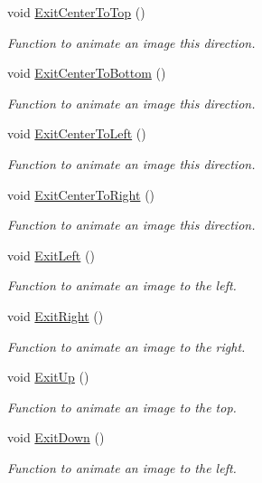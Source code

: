 \begin{DoxyCompactItemize}
void \hyperlink{classCutscene_ac6fd256f1045eca8b4c7c7f6f43e23ea}{Exit\-Center\-To\-Top} ()
\begin{DoxyCompactList}\small\item\em Function to animate an image this direction. \end{DoxyCompactList}\item 
void \hyperlink{classCutscene_acece444d79bd4eacfee58dfb883ce8d2}{Exit\-Center\-To\-Bottom} ()
\begin{DoxyCompactList}\small\item\em Function to animate an image this direction. \end{DoxyCompactList}\item 
void \hyperlink{classCutscene_a240a35626eb9cb2b6eb77d120eb55827}{Exit\-Center\-To\-Left} ()
\begin{DoxyCompactList}\small\item\em Function to animate an image this direction. \end{DoxyCompactList}\item 
void \hyperlink{classCutscene_add9a905183c22afd95680b3912902786}{Exit\-Center\-To\-Right} ()
\begin{DoxyCompactList}\small\item\em Function to animate an image this direction. \end{DoxyCompactList}\item 
void \hyperlink{classCutscene_a9d00e9b0347ad1402cf248be2bcc54fc}{Exit\-Left} ()
\begin{DoxyCompactList}\small\item\em Function to animate an image to the left. \end{DoxyCompactList}\item 
void \hyperlink{classCutscene_a52b632ccd15f2ecd889e1b8459a79014}{Exit\-Right} ()
\begin{DoxyCompactList}\small\item\em Function to animate an image to the right. \end{DoxyCompactList}\item 
void \hyperlink{classCutscene_ae429c590578f37aca1d19d11e77e0b82}{Exit\-Up} ()
\begin{DoxyCompactList}\small\item\em Function to animate an image to the top. \end{DoxyCompactList}\item 
void \hyperlink{classCutscene_afec50ab0b3730e1f1e2c1e78e2369012}{Exit\-Down} ()
\begin{DoxyCompactList}\small\item\em Function to animate an image to the left. \end{DoxyCompactList}\item 

\end{DoxyCompactItemize}
